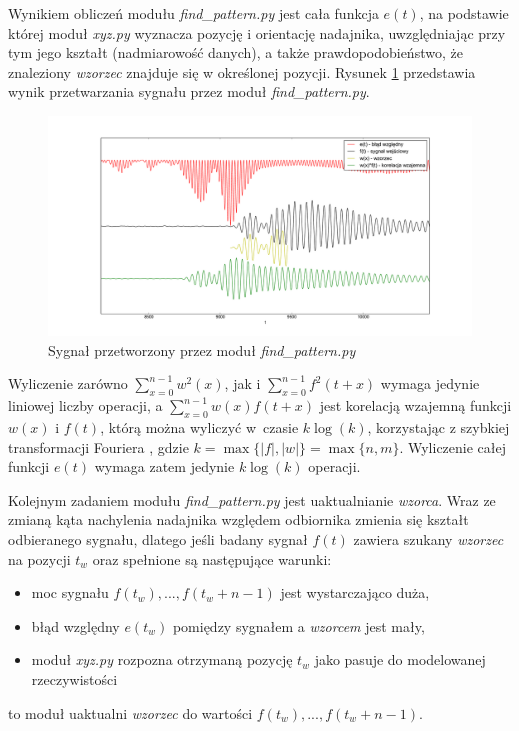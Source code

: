  Wynikiem obliczeń modułu \textit{find\_pattern.py} jest cała funkcja $e(t)$, na podstawie której moduł \textit{xyz.py}
 wyznacza pozycję i orientację nadajnika, uwzględniając przy tym 
 jego kształt (nadmiarowość danych), a także prawdopodobieństwo, że znaleziony \textit{wzorzec} znajduje się w określonej pozycji.
 Rysunek \ref{fig:blad_korel} przedstawia wynik przetwarzania sygnału przez moduł \textit{find\_pattern.py}.

\begin{figure}[h!]
    \centering
    \includegraphics[width=1.13\textwidth, trim= 53mm 0mm 0mm 0mm,clip]{blad_korel}
    \caption{Sygnał przetworzony przez moduł \textit{find\_pattern.py}}
    \label{fig:blad_korel}
\end{figure}
 
 
 Wyliczenie zarówno $ \sum\limits_{x=0}^{n-1}  w^2(x) $,
jak i $\sum\limits_{x=0}^{n-1} f^2(t+x)$ wymaga jedynie liniowej liczby operacji, a 
 $\sum\limits_{x=0}^{n-1}  w(x) f(t+x) $ jest korelacją wzajemną funkcji $w(x)$ i $f(t)$, którą
 można wyliczyć w~czasie $k \log(k)$, korzystając z szybkiej transformacji Fouriera \cite{bib:FFT_correlation},
 gdzie $k = \max \{|f|, |w| \} = \max \{n,m\}$. Wyliczenie całej funkcji $e(t)$ wymaga zatem jedynie $k \log(k)$ operacji.

 
 Kolejnym zadaniem modułu \textit{find\_pattern.py} jest uaktualnianie \textit{wzorca}.
 Wraz ze zmianą kąta nachylenia nadajnika względem odbiornika zmienia się kształt odbieranego sygnału,
 dlatego jeśli badany sygnał $f(t)$ zawiera szukany \textit{wzorzec} na pozycji $t_w$ 
 oraz spełnione są następujące warunki:
 \begin{itemize}
  \item moc sygnału $f(t_w), ..., f(t_w+n-1)$ jest wystarczająco duża,
  \item błąd względny $e(t_w)$ pomiędzy sygnałem a \textit{wzorcem} jest mały,
  \item moduł \textit{xyz.py} rozpozna otrzymaną pozycję $t_w$ jako pasuje do modelowanej rzeczywistości
 \end{itemize}
to moduł uaktualni \textit{wzorzec} do wartości $f(t_w), ..., f(t_w+n-1)$.
 
